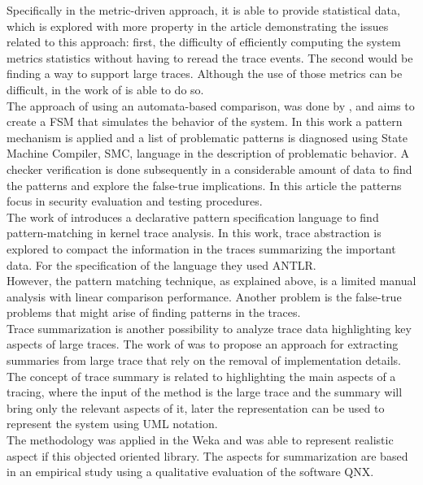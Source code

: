 Specifically in the metric-driven approach, it is able to provide statistical data, which is explored with more property in the article \cite{Ezzati-Jivan2013FCS24331402433151} demonstrating the issues related to this approach: first, the difficulty of efficiently computing the system metrics statistics without having to reread the trace events. The second would be finding a way to support large traces. Although the use of those metrics can be difficult, in the work of \cite{debugging_cluster} is able to do so.\\
The approach of using an automata-based comparison, was done by \cite{matni}, and aims to create a FSM  that simulates the behavior of the system. In this work a pattern mechanism is applied and a list of problematic patterns is diagnosed using State Machine Compiler, SMC, language in the description of problematic behavior. A checker verification is done subsequently in a considerable amount of data to find the patterns and explore the false-true implications. In this article the patterns focus in security evaluation and testing procedures. \\
The work of \cite{TraceFile} introduces a declarative pattern specification language to find pattern-matching in kernel trace analysis. In this work, trace abstraction is explored to compact the information in the traces summarizing the important data. For the specification of the language they used ANTLR.\\
However, the pattern matching technique, as explained above, is a limited manual analysis with linear comparison performance. Another problem is the false-true problems that might arise of finding patterns in the traces.\\
Trace summarization is another possibility to analyze trace data highlighting key aspects of large traces. The work of \cite{summarizing_traces} was to propose an approach for extracting summaries from large trace that rely on the removal of implementation details. The concept of trace summary is related to highlighting the main aspects of a tracing, where the input of the method is the large trace and the summary will bring only the relevant aspects of it, later the representation can be used to represent the system using UML notation. \\
The methodology was applied in the Weka \cite{weka} and was able to represent realistic aspect if this objected oriented library. The aspects for summarization are based in an empirical study using a qualitative evaluation of the software QNX. \\
